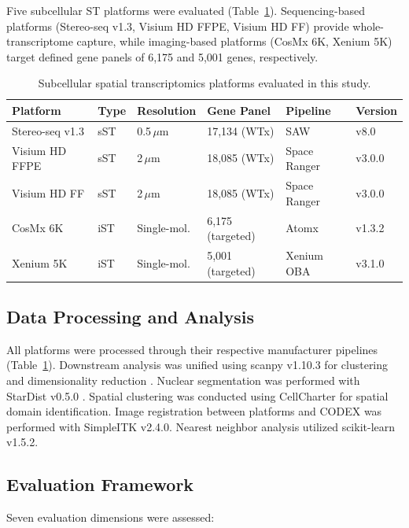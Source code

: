 \documentclass[11pt]{article}
\begin{document}
Five subcellular ST platforms were evaluated (Table~\ref{tab:platforms}). Sequencing-based platforms (Stereo-seq v1.3, Visium HD FFPE, Visium HD FF) provide whole-transcriptome capture, while imaging-based platforms (CosMx 6K, Xenium 5K) target defined gene panels of 6,175 and 5,001 genes, respectively.

\begin{table}[ht]
\centering
\caption{Subcellular spatial transcriptomics platforms evaluated in this study.}
\label{tab:platforms}
\begin{tabular}{@{}llllll@{}}
\toprule
Platform & Type & Resolution & Gene Panel & Pipeline & Version \\
\midrule
Stereo-seq v1.3 & sST & 0.5\,$\mu$m & 17,134 (WTx) & SAW & v8.0 \\
Visium HD FFPE & sST & 2\,$\mu$m & 18,085 (WTx) & Space Ranger & v3.0.0 \\
Visium HD FF & sST & 2\,$\mu$m & 18,085 (WTx) & Space Ranger & v3.0.0 \\
CosMx 6K & iST & Single-mol. & 6,175 (targeted) & Atomx & v1.3.2 \\
Xenium 5K & iST & Single-mol. & 5,001 (targeted) & Xenium OBA & v3.1.0 \\
\bottomrule
\end{tabular}
\end{table}

\subsection{Data Processing and Analysis}

All platforms were processed through their respective manufacturer pipelines (Table~\ref{tab:platforms}). Downstream analysis was unified using scanpy v1.10.3 for clustering and dimensionality reduction \citep{wolf2018scanpy}. Nuclear segmentation was performed with StarDist v0.5.0 \citep{schmidt2018cell}. Spatial clustering was conducted using CellCharter for spatial domain identification. Image registration between platforms and CODEX was performed with SimpleITK v2.4.0. Nearest neighbor analysis utilized scikit-learn v1.5.2.

\subsection{Evaluation Framework}

Seven evaluation dimensions were assessed:
\end{document}
